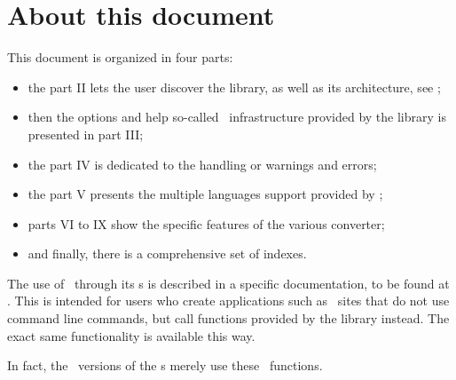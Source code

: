 



\chapter{About this document}

This document is organized in four parts:
\begin{itemize}
\item the part II lets the user discover the library, as well as its architecture, see ;
\item then the options and help so-called \oahRepr\ infrastructure provided by the library is presented in part III;
\item the part IV is dedicated to the handling or warnings and errors;
\item the part V presents the multiple languages support provided by \mf;
\item parts VI to IX show the specific features of the various converter;
\item and finally, there is a comprehensive set of indexes.
\end{itemize}

The use of \mf\ through its \API s is described in a specific documentation, to be found at . This is intended for users who create applications such as \Web\ sites that do not use command line commands, but call functions provided by the library instead. The exact same functionality is available this way.

In fact, the \CLI\ versions of the \service s merely use these \API\ functions.
